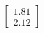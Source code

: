 \documentclass[preview]{standalone}
\begin{document}
\begin{align*}
\begin{bmatrix} 1.81 \\ 2.12 \end{bmatrix}
\end{align*}
\end{document}
